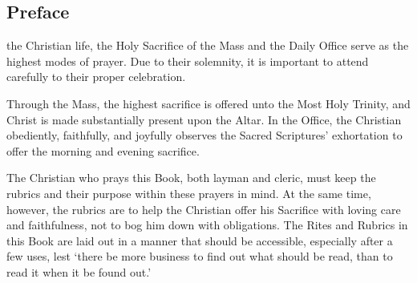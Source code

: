 {}
\subsection{Preface}
 the Christian life, the Holy Sacrifice of the Mass and the Daily Office serve as the highest modes of prayer. Due to their solemnity, it is important to attend carefully to their proper celebration.

	Through the Mass, the highest sacrifice is offered unto the Most Holy Trinity, and Christ is made substantially present upon the Altar. In the Office, the Christian obediently, faithfully, and joyfully observes the Sacred Scriptures' exhortation to offer the morning and evening sacrifice.
	
	The Christian who prays this Book, both layman and cleric, must keep the rubrics and their purpose within these prayers in mind. At the same time, however, the rubrics are to help the Christian offer his Sacrifice with loving care and faithfulness, not to bog him down with obligations. The Rites and Rubrics in this Book are laid out in a manner that should be accessible, especially after a few uses, lest `there be more business to find out what should be read, than to read it when it be found out.'
